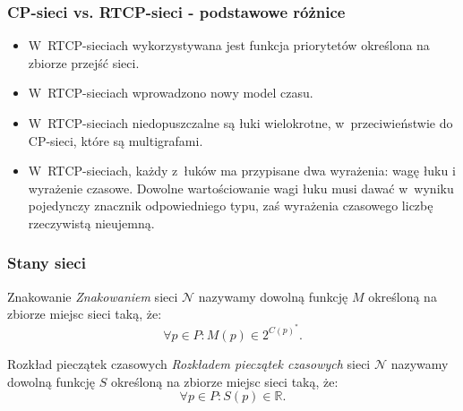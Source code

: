 \documentclass{beamer}
\begin{document}


\begin{frame}
\frametitle{CP-sieci vs. RTCP-sieci - podstawowe różnice}

\begin{itemize}[<+->] %
\setlength{\itemsep}{3mm}

\item W~RTCP-sieciach wykorzystywana jest funkcja priorytetów określona na zbiorze przejść sieci.

\item W~RTCP-sieciach wprowadzono nowy model czasu.

\item W~RTCP-sieciach niedopuszczalne są łuki wielokrotne, w~przeciwieństwie do CP-sieci, które są multigrafami.

\item W~RTCP-sieciach, każdy z~łuków ma przypisane dwa wyrażenia: wagę łuku i wyrażenie czasowe. Dowolne wartościowanie wagi łuku musi dawać w~wyniku pojedynczy znacznik odpowiedniego typu, zaś wyrażenia czasowego liczbę rzeczywistą nieujemną. 


\end{itemize}


\end{frame}




\begin{frame}
\frametitle{Stany sieci}

\begin{block}{Znakowanie}
{\em Znakowaniem} sieci $\mathcal{N}$ nazywamy dowolną funkcję $M$ określoną na zbiorze miejsc sieci taką, że:
 \begin{equation} 
\label{eq:znakowanie}
\forall p \in P \colon M(p) \in 2^{C(p)^*}.
\end{equation}
\end{block}

\pause

\begin{block}{Rozkład pieczątek czasowych}
{\em Rozkładem pieczątek czasowych} sieci $\mathcal{N}$ nazywamy dowolną funkcję $S$ określoną na zbiorze miejsc sieci taką, że: 
\begin{equation}
\label{eq:rozkladPieczatek}
\forall p \in P \colon S(p) \in \mathbb{R}.
\end{equation}
\end{block}

\end{frame}
\end{document}
